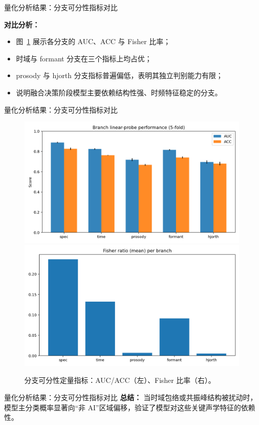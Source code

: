 \documentclass[aspectratio=169]{beamer}
\begin{document}
\begin{frame}{量化分析结果：分支可分性指标对比}

\textbf{对比分析：}
\begin{itemize}
  \item 图~\ref{fig:branch_metrics} 展示各分支的 AUC、ACC 与 Fisher 比率；
  \item 时域与 formant 分支在三个指标上均占优；
  \item prosody 与 hjorth 分支指标普遍偏低，表明其独立判别能力有限；
  \item 说明融合决策阶段模型主要依赖结构性强、时频特征稳定的分支。
\end{itemize}
\end{frame}

\begin{frame}{量化分析结果：分支可分性指标对比}
\begin{figure}
  \centering
  \includegraphics[width=0.32\linewidth]{images_in_paper/branch_metrics_auc_acc.png}
  \includegraphics[width=0.32\linewidth]{images_in_paper/branch_fisher.png}
  \caption{分支可分性定量指标：AUC/ACC（左）、Fisher 比率（右）。}
  \label{fig:branch_metrics}
\end{figure}
\end{frame}

\begin{frame}{量化分析结果：分支可分性指标对比}
\textbf{总结：}
当时域包络或共振峰结构被扰动时，  
模型主分类概率显著向“非 AI”区域偏移，验证了模型对这些关键声学特征的依赖性。
\end{frame}

%
%
\end{document}
